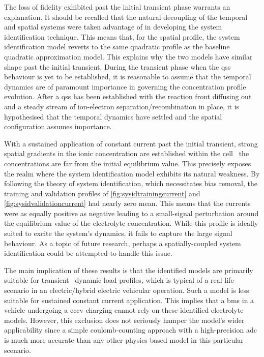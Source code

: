 The  loss  of fidelity  exhibited  past  the  initial transient  phase  warrants
an  explanation. It  should  be  recalled that  the  natural  decoupling of  the
temporal and  spatial systems were taken  advantage of in developing  the system
identification technique. This  means that, for the spatial  profile, the system
identification  model reverts  to the  same  quadratic profile  as the  baseline
quadratic approximation  model. This  explains why the  two models  have similar
shape past the initial transient. During  the transient phase when the \gls{qss}
behaviour is yet to be established, it is reasonable to assume that the temporal
dynamics  are of  paramount importance  in governing  the concentration  profile
evolution.  After a  \gls{qss}  has  been established  with  the reaction  front
diffusing out  and a steady  stream of ion-electron  separation/recombination in
place,  it is  hypothesised  that the  temporal dynamics  have  settled and  the
spatial configuration assumes importance.

With a  sustained application  of constant current  past the  initial transient,
strong spatial gradients  in the ionic concentration are  established within the
cell \ie~the  concentrations are far from the initial  equilibrium value. This
precisely  exposes the  realm  where the  system  identification model  exhibits
its  natural  weakness.  By  following  the  theory  of  system  identification,
which  necessitates   bias  removal,   the  training  and   validation  profiles
of \cref{fig:sysidtrainingcurrent}   and \cref{fig:sysidvalidationcurrent}   had
nearly  zero mean.  This means  that the  currents were  as equally  positive as
negative leading to a small-signal  perturbation around the equilibrium value of
the electrolyte  concentration. While this  profile is ideally suited  to excite
the system's  dynamics, it  fails to  capture the large  signal behaviour.  As a
topic  of future  research,  perhaps a  spatially-coupled system  identification
could be attempted to handle this issue.

The  main  implication of  these  results  is  that  the identified  models  are
primarily suitable for  transient \ie~dynamic load profiles,  which is typical
of a real-life scenario in an electric/hybrid electric vehicular operation. Such
a  model is  less  suitable  for sustained  constant  current application.  This
implies that  a \gls{bms} in a  vehicle undergoing a \gls{cccv}  charging cannot
rely on  these identified electrolyte  models. However, this exclusion  does not
seriously hamper the model's wider applicability since a simple coulomb-counting
approach with  a high-precision \gls{adc} is  much more accurate than  any other
physics based model in this particular scenario.

